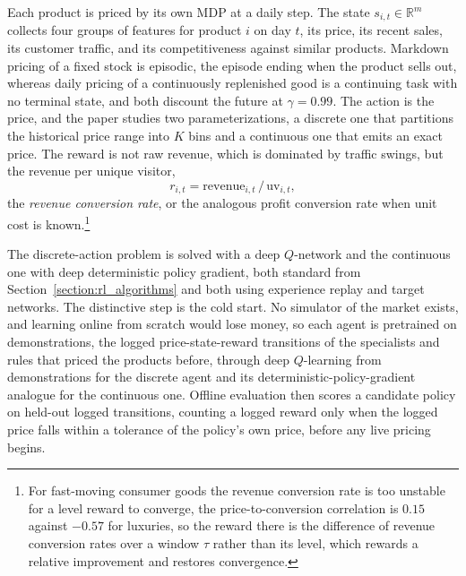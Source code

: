 Each product is priced by its own MDP at a daily step. The state $s_{i,t}\in\mathbb{R}^{m}$ collects four groups of features for product $i$ on day $t$, its price, its recent sales, its customer traffic, and its competitiveness against similar products. Markdown pricing of a fixed stock is episodic, the episode ending when the product sells out, whereas daily pricing of a continuously replenished good is a continuing task with no terminal state, and both discount the future at $\gamma=0.99$. The action is the price, and the paper studies two parameterizations, a discrete one that partitions the historical price range into $K$ bins and a continuous one that emits an exact price. The reward is not raw revenue, which is dominated by traffic swings, but the revenue per unique visitor,
\begin{equation}
r_{i,t}=\mathrm{revenue}_{i,t}\,/\,\mathrm{uv}_{i,t},
\end{equation}
the \emph{revenue conversion rate}, or the analogous profit conversion rate when unit cost is known.\footnote{For fast-moving consumer goods the revenue conversion rate is too unstable for a level reward to converge, the price-to-conversion correlation is $0.15$ against $-0.57$ for luxuries, so the reward there is the difference of revenue conversion rates over a window $\tau$ rather than its level, which rewards a relative improvement and restores convergence.}

The discrete-action problem is solved with a deep $Q$-network and the continuous one with deep deterministic policy gradient, both standard from Section~\ref{section:rl_algorithms} and both using experience replay and target networks. The distinctive step is the cold start. No simulator of the market exists, and learning online from scratch would lose money, so each agent is pretrained on demonstrations, the logged price-state-reward transitions of the specialists and rules that priced the products before, through deep $Q$-learning from demonstrations for the discrete agent and its deterministic-policy-gradient analogue for the continuous one. Offline evaluation then scores a candidate policy on held-out logged transitions, counting a logged reward only when the logged price falls within a tolerance of the policy's own price, before any live pricing begins.

